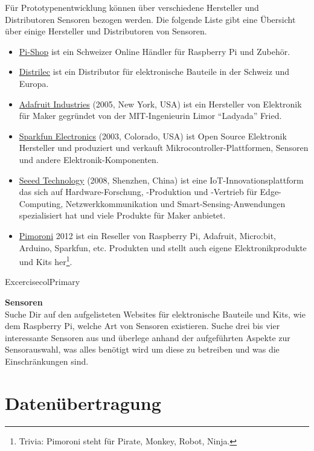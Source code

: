 \documentclass[
  11pt,
  a4paper,
  oneside, openany  ,captions=tableheading
]{scrbook}
\providecommand{\tightlist}{%
  \setlength{\itemsep}{0pt}\setlength{\parskip}{0pt}}
\theoremstyle{remark}
\begin{document}
Für Prototypenentwicklung können über verschiedene Hersteller und
Distributoren Sensoren bezogen werden. Die folgende Liste gibt eine
Übersicht über einige Hersteller und Distributoren von Sensoren.

\begin{itemize}
\tightlist
\item
  \href{https://www.pi-shop.ch}{Pi-Shop} ist ein Schweizer Online
  Händler für Raspberry Pi und Zubehör.
\item
  \href{https://www.distrelec.ch}{Distrilec} ist ein Distributor für
  elektronische Bauteile in der Schweiz und Europa.
\item
  \href{https://www.adafruit.com}{Adafruit Industries} (2005, New York,
  USA) ist ein Hersteller von Elektronik für Maker gegründet von der
  MIT-Ingenieurin Limor ``Ladyada'' Fried.
\item
  \href{https://www.sparkfun.com}{Sparkfun Electronics} (2003, Colorado,
  USA) ist Open Source Elektronik Hersteller und produziert und verkauft
  Mikrocontroller-Plattformen, Sensoren und andere
  Elektronik-Komponenten.
\item
  \href{https://www.seeedstudio.com}{Seeed Technology} (2008, Shenzhen,
  China) ist eine IoT-Innovationsplattform das sich auf
  Hardware-Forschung, -Produktion und -Vertrieb für Edge-Computing,
  Netzwerkkommunikation und Smart-Sensing-Anwendungen spezialisiert hat
  und viele Produkte für Maker anbietet.
\item
  \href{https://shop.pimoroni.com}{Pimoroni} 2012 ist ein Reseller von
  Raspberry Pi, Adafruit, Micro:bit, Arduino, Sparkfun, etc. Produkten
  und stellt auch eigene Elektronikprodukte und Kits her\footnote{Trivia:
    Pimoroni steht für Pirate, Monkey, Robot, Ninja.}.
\end{itemize}

\begin{boxtitle}{Excercise}{colPrimary}

\textbf{Sensoren}\\
Suche Dir auf den aufgelisteten Websites für elektronische Bauteile und
Kits, wie dem Raspberry Pi, welche Art von Sensoren existieren. Suche
drei bis vier interessante Sensoren aus und überlege anhand der
aufgeführten Aspekte zur Sensorauswahl, was alles benötigt wird um diese
zu betreiben und was die Einschränkungen sind.

\end{boxtitle}

\chapter{Datenübertragung}\label{datenuxfcbertragung}
\end{document}
